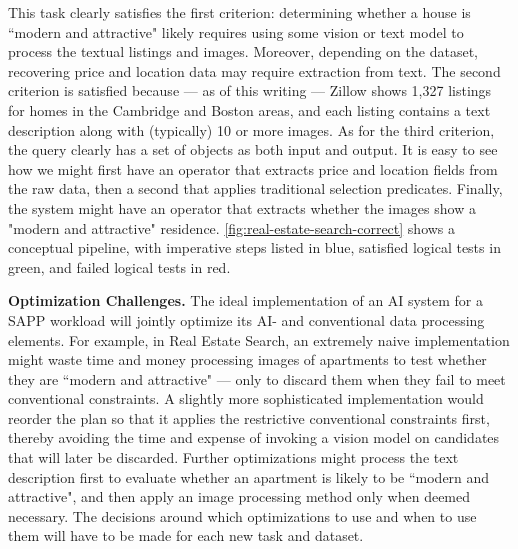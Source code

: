 This task clearly satisfies the first criterion: determining whether a house is ``modern and attractive" likely requires using some vision or text model to process the textual listings and images. Moreover, depending on the dataset, recovering price and location data may require extraction from text.  The second criterion is satisfied because --- as of this writing --- Zillow shows 1,327 listings for homes in the Cambridge and Boston areas, and each listing contains a text description along with (typically) 10 or more images. As for the third criterion, the query clearly has a set of objects as both input and output. It is easy to see how we might first have an operator that extracts price and location fields from the raw data, then a second that applies traditional selection predicates. Finally, the system might have an operator that extracts whether the images show a "modern and attractive" residence.  \autoref{fig:real-estate-search-correct} shows a conceptual pipeline, with imperative steps listed in blue, satisfied logical tests in green, and failed logical tests in red.

{\bf Optimization Challenges.} The ideal implementation of an AI system for a SAPP workload will jointly optimize its AI- and conventional data processing elements. For example, in Real Estate Search, an extremely naive implementation might waste time and money processing images of apartments to test whether they are ``modern and attractive" --- only to discard them when they fail to meet conventional constraints. A slightly more sophisticated implementation would reorder the plan so that it applies the restrictive conventional constraints first, thereby avoiding the time and expense of invoking a vision model on candidates that will later be discarded. Further optimizations might process the text description first to evaluate whether an apartment is likely to be ``modern and attractive", and then apply an image processing method only when deemed necessary. The decisions around which optimizations to use and when to use them will have to be made for each new task and dataset.


